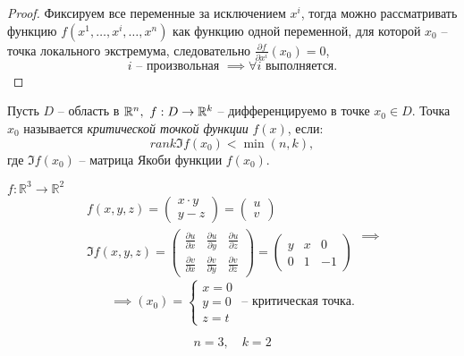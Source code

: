 \begin{proof}
    Фиксируем все переменные за исключением $ x^i $, тогда можно рассматривать функцию $ f(x^1,\ldots,x^i,\ldots,x^n) $ как функцию одной переменной, для которой $ x_0 $ -- точка локального экстремума, следовательно $ \frac{\partial f}{\partial x^i}(x_0) = 0 $,
    \[
        i \text{ -- произвольная }\implies \forall i \text{ выполняется}.
    \]
\end{proof}

\begin{definition}
    Пусть $ D $ -- область в $ \mathbb{R}^n, \ f:D \rightarrow\mathbb{R}^k $ -- дифференцируемо в точке $ x_0 \in D $. Точка $ x_0 $ называется \emph{критической точкой функции} $ f(x) $, если:
    \[
        rank \mathfrak{I} f(x_0) < \min(n,k),
    \] где $ \mathfrak{I}f(x_0) $ -- матрица Якоби функции $ f(x_0) $.
\end{definition}

\begin{example}
    $f:\mathbb{R}^3 \rightarrow\mathbb{R}^2$
    \[
        \begin{array}{l}
            f(x,y,z) = \left(\begin{matrix}
                                     x\cdot y \\ y - z
                                 \end{matrix}\right) = \left(\begin{matrix}
                                                                 u \\ v
                                                             \end{matrix}\right) \\
            \mathfrak{I} f(x,y,z) = \left(\begin{matrix}
                                                  \frac{\partial u}{\partial x} & \frac{\partial u}{\partial y} & \frac{\partial u}{\partial z} \\ \frac{\partial v}{\partial x} & \frac{\partial v}{\partial y} & \frac{\partial v}{\partial z}
                                              \end{matrix}\right) = \left(\begin{matrix}
                                                                              y & x & 0 \\ 0 & 1 & -1
                                                                          \end{matrix} \right)
        \end{array} \implies
    \]
    \[
        \implies (x_0) = \left\{ \begin{array}{l}
            x = 0 \\
            y = 0 \\
            z = t
        \end{array}\right.\text{ -- критическая точка}.
    \]

    \begin{equation*}
        n = 3, \quad k = 2
    \end{equation*}
\end{example}

